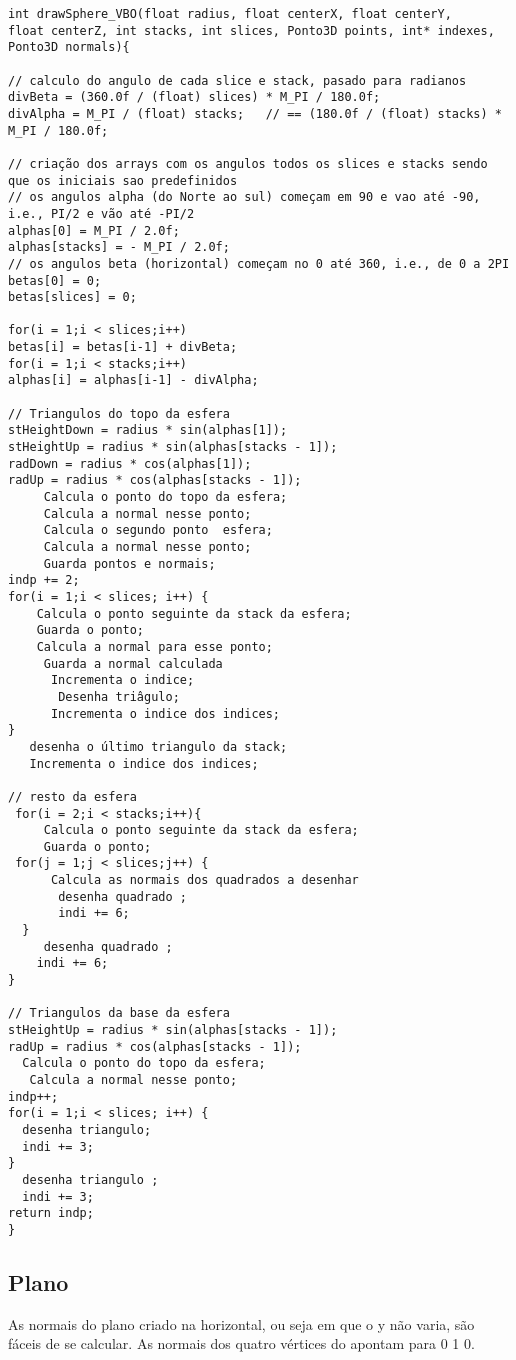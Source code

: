 \begin{verbatim}
int drawSphere_VBO(float radius, float centerX, float centerY, 
float centerZ, int stacks, int slices, Ponto3D points, int* indexes, 
Ponto3D normals){

// calculo do angulo de cada slice e stack, pasado para radianos
divBeta = (360.0f / (float) slices) * M_PI / 180.0f;
divAlpha = M_PI / (float) stacks; 	// == (180.0f / (float) stacks) * M_PI / 180.0f;

// criação dos arrays com os angulos todos os slices e stacks sendo que os iniciais sao predefinidos
// os angulos alpha (do Norte ao sul) começam em 90 e vao até -90, i.e., PI/2 e vão até -PI/2
alphas[0] = M_PI / 2.0f;
alphas[stacks] = - M_PI / 2.0f;
// os angulos beta (horizontal) começam no 0 até 360, i.e., de 0 a 2PI
betas[0] = 0;
betas[slices] = 0;

for(i = 1;i < slices;i++)
betas[i] = betas[i-1] + divBeta;
for(i = 1;i < stacks;i++)
alphas[i] = alphas[i-1] - divAlpha;

// Triangulos do topo da esfera
stHeightDown = radius * sin(alphas[1]);
stHeightUp = radius * sin(alphas[stacks - 1]);	
radDown = radius * cos(alphas[1]);
radUp = radius * cos(alphas[stacks - 1]);	
     Calcula o ponto do topo da esfera; 
     Calcula a normal nesse ponto; 
     Calcula o segundo ponto  esfera; 
     Calcula a normal nesse ponto; 
     Guarda pontos e normais; 
indp += 2;
for(i = 1;i < slices; i++) {
    Calcula o ponto seguinte da stack da esfera;
    Guarda o ponto; 
    Calcula a normal para esse ponto; 
     Guarda a normal calculada 
      Incrementa o indice; 
       Desenha triâgulo; 
      Incrementa o indice dos indices; 
}
   desenha o último triangulo da stack; 
   Incrementa o indice dos indices; 

// resto da esfera
 for(i = 2;i < stacks;i++){
     Calcula o ponto seguinte da stack da esfera;
     Guarda o ponto; 
 for(j = 1;j < slices;j++) {
      Calcula as normais dos quadrados a desenhar 
       desenha quadrado ; 
       indi += 6;
  }
     desenha quadrado ; 
    indi += 6;
}

// Triangulos da base da esfera
stHeightUp = radius * sin(alphas[stacks - 1]);
radUp = radius * cos(alphas[stacks - 1]);
  Calcula o ponto do topo da esfera; 
   Calcula a normal nesse ponto; 
indp++;
for(i = 1;i < slices; i++) {
  desenha triangulo; 
  indi += 3;
}
  desenha triangulo ; 
  indi += 3;
return indp;
}
\end{verbatim}


\subsection{Plano}
As normais do plano criado na horizontal, ou seja em que o y não varia, são fáceis de se calcular. As normais dos quatro vértices do apontam para 0 1 0.

